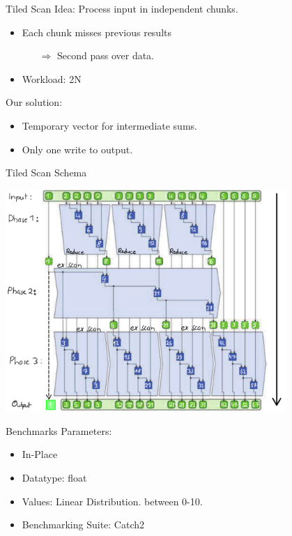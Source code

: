 \begin{frame}{Tiled Scan} 
Idea: Process input in independent chunks.
\begin{itemize}
 \item Each chunk misses previous results
 \begin{itemize}
 \item[$\Rightarrow$] Second pass over data.
 \end{itemize}
 \item Workload: 2N
\end{itemize}
\vspace{10pt}
Our solution:
\begin{itemize}
 \item Temporary vector for intermediate sums.
 \item Only one write to output.
\end{itemize}

\end{frame} 

\begin{frame}{Tiled Scan Schema}
 
  \centering
  \includegraphics[width=0.80\textwidth]{"wiki/3Phase Nice"}
 
\end{frame}

\begin{frame}{Benchmarks}
Parameters:
\begin{itemize}
 \item In-Place
 \item Datatype: float
 \item Values: Linear Distribution. between 0-10.
 \item Benchmarking Suite: Catch2
\end{itemize}


\end{frame}

